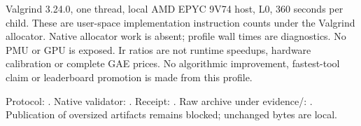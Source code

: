 \documentclass[10pt]{article}
\begin{document}
Valgrind 3.24.0, one thread, local AMD EPYC 9V74 host, L0, 360 seconds per
child. These are user-space implementation instruction counts under the
Valgrind allocator. Native allocator work is absent; profile wall times are
diagnostics. No PMU or GPU is exposed. Ir ratios are not runtime speedups,
hardware calibration or complete GAE prices. No algorithmic improvement,
fastest-tool claim or leaderboard promotion is made from this profile.

Protocol: . Native validator:
.
Receipt: .
Raw archive under evidence/: .
Publication of oversized artifacts remains blocked; unchanged bytes are local.
\end{document}
